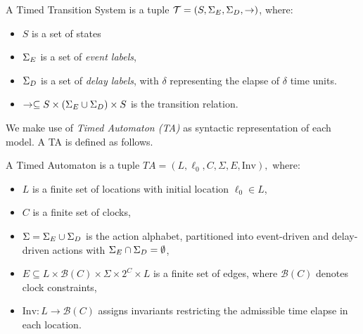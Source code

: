 \begin{definition}%
  \label{def:tts}
A {Timed Transition System} is a tuple
$\mathcal{T} = (S, \Sigma_E, \Sigma_D, \rightarrow)$, where:
\begin{itemize}
    \item $S$ is a set of states%
    \item $\Sigma_E$ is a set of \emph{event labels},
    \item $\Sigma_D$ is a set of \emph{delay labels}, with $\delta$ representing the elapse of $\delta$ time units. 
    
    
    \item $\rightarrow \subseteq S \times (\Sigma_E \cup \Sigma_D) \times S$
    is the transition relation.
\end{itemize}
\end{definition}









We make use of \emph{Timed Automaton (TA)} \cite{ALUR19932, Bouyer2005AnIT} as syntactic representation of each model. A TA is defined as follows. %

\begin{definition}%
  \label{def:ta}
    A Timed Automaton is a tuple
\(
TA = (L, \ell_0, C, \Sigma, E, \text{Inv}),
\) 
where:
\begin{itemize}
  \item $L$ is a finite set of locations with initial location $\ell_0 \in L$,
  \item $C$ is a finite set of clocks,
  \item $\Sigma = \Sigma_E \cup \Sigma_D$ is the action alphabet, partitioned into event-driven and delay-driven actions with $\Sigma_E \cap \Sigma_D = \emptyset$,
  \item $E \subseteq L \times \mathcal{B}(C) \times \Sigma \times 2^C \times L$ is a finite set of edges, where $\mathcal{B}(C)$ denotes clock constraints,
  \item $\text{Inv}: L \to \mathcal{B}(C)$ assigns invariants restricting the admissible time elapse in each location.
\end{itemize}
\end{definition}






